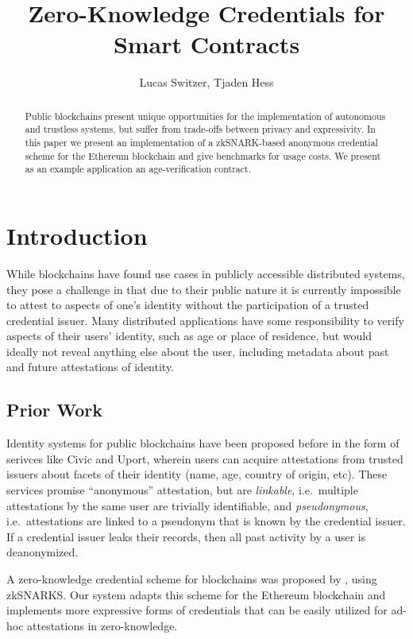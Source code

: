\documentclass[11 pt]{extarticle}
\theoremstyle{remark}
\begin{document}
\onehalfspacing

\title{Zero-Knowledge Credentials for Smart Contracts}
\author{Lucas Switzer, Tjaden Hess}

\maketitle

\begin{abstract}
	Public blockchains present unique opportunities for the implementation of
	autonomous and trustless systems, but suffer from trade-offs between
	privacy and expressivity. In this paper we present an implementation of a
	zkSNARK-based
	anonymous credential scheme for the Ethereum blockchain and give
	benchmarks for usage costs. We present as an example application an
  age-verification contract.
\end{abstract}

\section{Introduction}
While blockchains have found use cases in publicly accessible distributed
systems, they pose a challenge in that due to their public nature it is
currently impossible to attest to aspects of one's identity without the
participation of a trusted credential issuer. Many distributed applications have
some responsibility to verify aspects of their users' identity, such as age or
place of residence, but would ideally not reveal anything else about the user,
including metadata about past and future attestations of identity.

\subsection{Prior Work}
Identity systems for public blockchains have been proposed before in the form of
serivces like Civic and Uport, wherein users can acquire attestations from
trusted issuers about facets of their identity (name, age, country of origin,
etc). These services promise ``anonymous'' attestation, but are
\textit{linkable}, i.e.\ multiple attestations by the same user are trivially
identifiable, and \textit{pseudonymous}, i.e.\ attestations are
linked to a pseudonym that is known by the credential issuer. If a credential
issuer leaks their records, then all past activity by a user is deanonymized.

A zero-knowledge credential scheme for blockchains was proposed by
\citet{garmanDecentralizedAnonymousCredentials2013}, using zkSNARKS. Our system
adapts this scheme for the Ethereum\cite{woodEthereumSecureDecentralised2014} blockchain and implements more expressive
forms of credentials that can be easily utilized for ad-hoc attestations in zero-knowledge.
\end{document}
